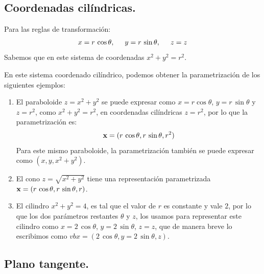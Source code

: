 \subsection*{Coordenadas cilíndricas.}

Para las reglas de transformación:
\begin{align*}
x = r \, \cos \theta, \hspace{0.5cm} y = r \, \sin \theta, \hspace{0.5cm} z = z
\end{align*}
Sabemos que en este sistema de coordenadas $x^{2} + y^{2} = r^{2}$. 
\par
En este sistema coordenado cilíndrico, podemos obtener la parametrización de los siguientes ejemplos:
\begin{enumerate}[label=\alph*)]
\item El paraboloide $z= x^{2} + y^{2}$ se puede expresar como $x = r \cos \theta$, $y = r \, \sin \theta$ y $z = r^{2}$, como $x^{2} + y^{2} = r^{2}$, en coordenadas cilíndricas $z = r^{2}$, por lo que la parametrización es:
\begin{align*}
\vb{x} = (r \, \cos \theta, r \, \sin \theta, r^{2})
\end{align*}
Para este mismo paraboloide, la parametrización también se puede expresar como $(x, y, x^{2}+ y^{2})$.
\item El cono $z = \sqrt{x^{2} + y^{2}}$ tiene una representación parametrizada $\vb{x} = (r \, \cos \theta, r \, \sin \theta, r)$.
\item El cilindro $x^{2} + y^{2} = 4$, es tal que el valor de $r$ es constante y vale $2$, por lo que los dos parámetros restantes $\theta$ y $z$, los usamos para representar este cilindro como $x = 2 \, \cos \theta$, $y = 2 \, \sin \theta$, $z = z$, que de manera breve lo escribimos como $vb{x} = (2 \, \cos \theta, y = 2 \, \sin \theta, z)$.
\end{enumerate}

\subsection{Plano tangente.}

